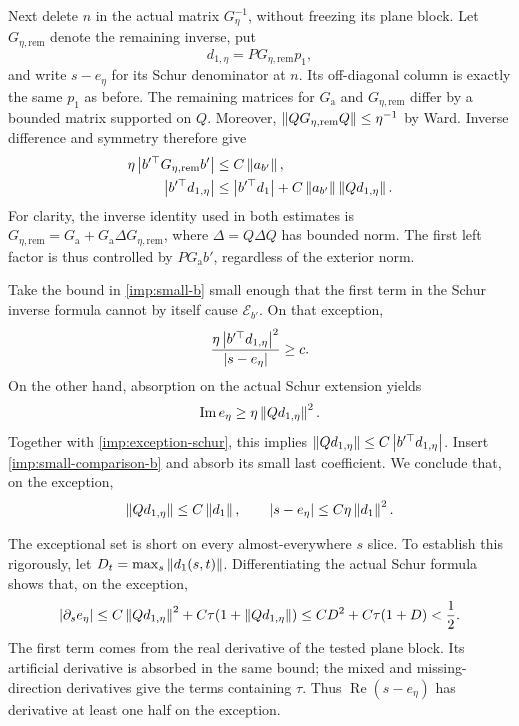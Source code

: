 Next delete $n$ in the actual matrix $G_\eta^{-1}$, without freezing its
plane block. Let $G_{\eta,\mathrm{rem}}$ denote the remaining inverse,
put
\[
 d_{1,\eta}=PG_{\eta,\mathrm{rem}}p_1,
\]
and write $s-e_\eta$ for its Schur denominator at $n$. Its off-diagonal
column is exactly the same $p_1$ as before. The remaining matrices for
$G_{\mathrm a}$ and $G_{\eta,\mathrm{rem}}$ differ by a bounded matrix
supported on $Q$. Moreover,
$\left\lVert QG_{\eta,\mathrm{rem}}Q\right\rVert\le\eta^{-1}$ by Ward. Inverse
difference and symmetry therefore give
\begin{align}
 \eta\left\lvert b'^\top G_{\eta,\mathrm{rem}}b'\right\rvert
   &\le C\left\lVert a_{b'}\right\rVert,
 \label{imp:small-comparison-a}\\
 \left\lvert b'^\top d_{1,\eta}\right\rvert
   &\le\left\lvert b'^\top d_1\right\rvert
       +C\left\lVert a_{b'}\right\rVert\left\lVert Qd_{1,\eta}\right\rVert.
 \label{imp:small-comparison-b}
\end{align}
For clarity, the inverse identity used in both estimates is
$G_{\eta,\mathrm{rem}}
=G_{\mathrm a}+G_{\mathrm a}\Delta G_{\eta,\mathrm{rem}}$,
where $\Delta=Q\Delta Q$ has bounded norm. The first left factor is thus
controlled by $PG_{\mathrm a}b'$, regardless of the exterior norm.

Take the bound in \cref{imp:small-b} small enough that the first term
in the Schur inverse formula cannot by itself cause
$\mathcal E_{b'}$. On that exception,
\begin{equation}
 \frac{\eta\left\lvert b'^\top d_{1,\eta}\right\rvert^2}{\left\lvert s-e_\eta\right\rvert}
 \ge c.
 \label{imp:exception-schur}
\end{equation}
On the other hand, absorption on the actual Schur extension yields
\[
 \operatorname{Im}e_\eta\ge\eta\left\lVert Qd_{1,\eta}\right\rVert^2.
\]
Together with \cref{imp:exception-schur}, this implies
$\left\lVert Qd_{1,\eta}\right\rVert\le C\left\lvert b'^\top d_{1,\eta}\right\rvert$. Insert
\cref{imp:small-comparison-b} and absorb its small last coefficient.
We conclude that, on the exception,
\begin{equation}
 \left\lVert Qd_{1,\eta}\right\rVert\le C\left\lVert d_1\right\rVert,
 \qquad
 \left\lvert s-e_\eta\right\rvert\le C\eta\left\lVert d_1\right\rVert^2.
 \label{imp:small-exception}
\end{equation}

The exceptional set is short on every almost-everywhere $s$ slice.
To establish this rigorously, let
$D_t=\max_s\left\lVert d_1(s,t)\right\rVert$. Differentiating the actual Schur formula
shows that, on the exception,
\[
 \left\lvert\partial_s e_\eta\right\rvert
 \le C\left\lVert Qd_{1,\eta}\right\rVert^2
       +C\tau(1+\left\lVert Qd_{1,\eta}\right\rVert)
 \le C D^2+C\tau(1+D)<\frac12.
\]
The first term comes from the real derivative of the tested plane
block. Its artificial derivative is absorbed in the same bound; the
mixed and missing-direction derivatives give the terms containing
$\tau$. Thus $\operatorname{Re}(s-e_\eta)$ has derivative at least
one half on the exception.

